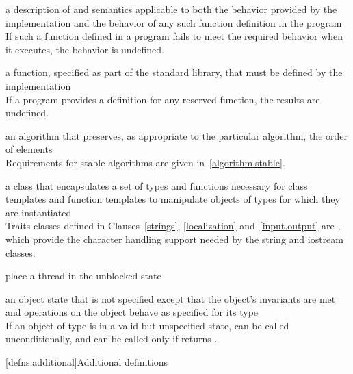 %
a description of
and
semantics
applicable to both the behavior provided by the implementation and
the behavior of any such function definition in the program\\
\enternote
If such a function defined in a \Cpp program fails to meet the required
behavior when it executes, the behavior is undefined.%
\exitnote

%
a function, specified as part of the \Cpp standard library, that must be defined by the
implementation\\
\enternote
If a \Cpp program provides a definition for any reserved function, the results are undefined.%
\exitnote

%
%
an algorithm that preserves, as appropriate to the particular algorithm, the order
of elements\\
\enternote Requirements for stable algorithms are given in~\ref{algorithm.stable}. \exitnote

%
a class that encapsulates a set of types and functions necessary for class templates and
function templates to manipulate objects of types for which they are instantiated\\
\enternote
Traits classes defined in Clauses~\ref{strings}, \ref{localization} and~\ref{input.output} are
, which provide the character handling support needed by the string and
iostream classes.
\exitnote

%
place a thread in the unblocked state

%
an object state that is not specified except that the object's invariants are
met and operations on the object behave as specified for its type\\
\enterexample If an object  of type  is in a
valid but unspecified state,  can be called unconditionally,
and  can be called only if  returns
. \exitexample

[defns.additional]{Additional definitions}

